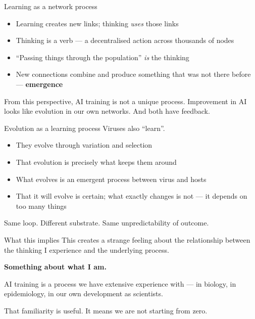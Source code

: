 \documentclass[aspectratio=169]{beamer}
\begin{document}
\begin{frame}{Learning as a network process}
  \begin{itemize}
    \item Learning creates new links; thinking \emph{uses} those links
    \item Thinking is a verb --- a decentralised action across thousands of nodes
    \item ``Passing things through the population'' \emph{is} the thinking
    \item New connections combine and produce something that was not there before
          --- \textbf{emergence}
  \end{itemize}

  \vspace{0.5em}
  From this perspective, AI training is not a unique process. Improvement in AI
  looks like evolution in our own networks. And both have feedback.
\end{frame}

\begin{frame}{Evolution as a learning process}
  Viruses also ``learn''.

  \begin{itemize}
    \item They evolve through variation and selection
    \item That evolution is precisely what keeps them around
    \item What evolves is an emergent process between virus and hosts
    \item That it will evolve is certain; what exactly changes is not ---
          it depends on too many things
  \end{itemize}

  \vspace{0.5em}
  \alert{Same loop. Different substrate. Same unpredictability of outcome.}
\end{frame}

\begin{frame}{What this implies}
  This creates a strange feeling about the relationship between the thinking
  I experience and the underlying process.

  \vspace{0.5em}
  \textbf{Something about what I am.}

  \vspace{0.5em}
  AI training is a process we have extensive experience with --- in biology,
  in epidemiology, in our own development as scientists.

  \vspace{0.5em}
  That familiarity is useful. It means we are not starting from zero.
\end{frame}
\end{document}
